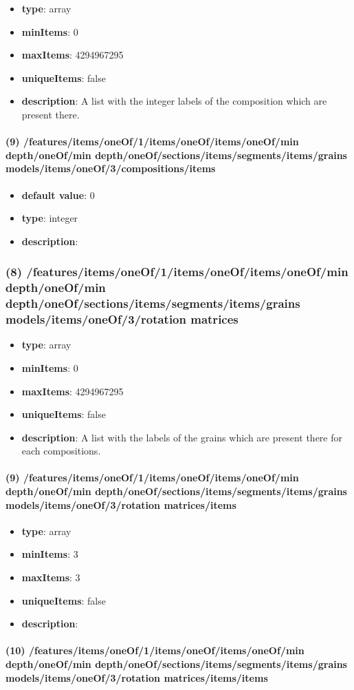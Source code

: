 \begin{itemize}[leftmargin=8em]\item {\bf type}: array
\item {\bf minItems}: 0
\item {\bf maxItems}: 4294967295
\item {\bf uniqueItems}: false
\item {\bf description}: A list with the integer labels of the composition which are present there.
\end{itemize}\paragraph{(9) /features/items/oneOf/1/items/oneOf/items/oneOf/min depth/oneOf/min depth/oneOf/sections/items/segments/items/grains models/items/oneOf/3/compositions/items}
\begin{itemize}[leftmargin=9em]\item {\bf default value}: 0
\item {\bf type}: integer
\item {\bf description}: 
\end{itemize}\subsubsection{(8) /features/items/oneOf/1/items/oneOf/items/oneOf/min depth/oneOf/min depth/oneOf/sections/items/segments/items/grains models/items/oneOf/3/rotation matrices}
\begin{itemize}[leftmargin=8em]\item {\bf type}: array
\item {\bf minItems}: 0
\item {\bf maxItems}: 4294967295
\item {\bf uniqueItems}: false
\item {\bf description}: A list with the labels of the grains which are present there for each compositions.
\end{itemize}\paragraph{(9) /features/items/oneOf/1/items/oneOf/items/oneOf/min depth/oneOf/min depth/oneOf/sections/items/segments/items/grains models/items/oneOf/3/rotation matrices/items}
\begin{itemize}[leftmargin=9em]\item {\bf type}: array
\item {\bf minItems}: 3
\item {\bf maxItems}: 3
\item {\bf uniqueItems}: false
\item {\bf description}: 
\end{itemize}\paragraph{(10) /features/items/oneOf/1/items/oneOf/items/oneOf/min depth/oneOf/min depth/oneOf/sections/items/segments/items/grains models/items/oneOf/3/rotation matrices/items/items}
